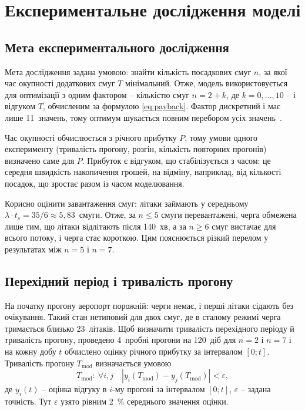 \section{Експериментальне дослідження моделі}
\label{sec:experiment}

\subsection{Мета експериментального дослідження}

Мета дослідження задана умовою: знайти кількість посадкових смуг $n$, за якої час окупності додаткових смуг $T$ мінімальний. Отже, модель використовується для оптимізації з одним фактором -- кількістю смуг $n = 2 + k$, де $k = 0, \ldots, 10$ -- і відгуком $T$, обчисленим за формулою \eqref{eq:payback}. Фактор дискретний і має лише 11~значень, тому оптимум шукається повним перебором усіх значень~\cite{stetsenko2024}.

Час окупності обчислюється з річного прибутку $P$, тому умови одного експерименту (тривалість прогону, розгін, кількість повторних прогонів) визначено саме для $P$. Прибуток є відгуком, що стабілізується з часом: це середня швидкість накопичення грошей, на відміну, наприклад, від кількості посадок, що зростає разом із часом моделювання.

Корисно оцінити завантаження смуг: літаки займають у середньому $\lambda \cdot t_s = 35/6 \approx 5{,}83$~смуги. Отже, за $n \le 5$ смуги перевантажені, черга обмежена лише тим, що літаки відлітають після 140~хв, а за $n \ge 6$ смуг вистачає для всього потоку, і черга стає короткою. Цим пояснюється різкий перелом у результатах між $n = 5$ і $n = 7$.

\subsection{Перехідний період і тривалість прогону}

На початку прогону аеропорт порожній: черги немає, і перші літаки сідають без очікування. Такий стан нетиповий для двох смуг, де в сталому режимі черга тримається близько 23~літаків. Щоб визначити тривалість перехідного періоду й тривалість прогону, проведено 4~пробні прогони на 120~діб для $n = 2$ і $n = 7$ і на кожну добу $t$ обчислено оцінку річного прибутку за інтервалом $[0; t]$. Тривалість прогону $T_{\text{mod}}$ визначається умовою~\cite{stetsenko2024}
\begin{equation}
T_{\text{mod}}: \ \forall i, j \quad |y_i(T_{\text{mod}}) - y_j(T_{\text{mod}})| < \varepsilon,
\label{eq:transient}
\end{equation}
де $y_i(t)$ -- оцінка відгуку в $i$-му прогоні за інтервалом $[0; t]$, $\varepsilon$ -- задана точність. Тут $\varepsilon$ узято рівним 2~\% середнього значення оцінки.

